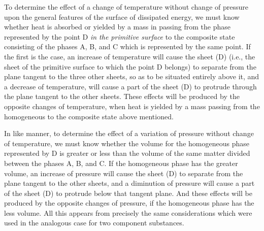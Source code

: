 \documentclass[12pt]{memoir}
\begin{document}
To determine the effect of a change of temperature without change of pressure upon the general features of the surface of dissipated energy, we must know whether heat is absorbed or yielded by a mass in passing from the phase represented by the point D \textit{in the primitive surface} to the composite state consisting of the phases A, B, and C which is represented by the same point. If the first is the case, an increase of temperature will cause the sheet (D) (i.e., the sheet of the primitive surface to which the point D belongs) to separate from the plane tangent to the three other sheets, so as to be situated entirely above it, and a decrease of temperature, will cause a part of the sheet (D) to protrude through the plane tangent to the other sheets.  These effects will be produced by the opposite changes of temperature, when heat is yielded by a mass passing from the homogeneous to the composite state above mentioned.


In like manner, to determine the effect of a variation of pressure without change of temperature, we must know whether the volume for the homogeneous phase represented by D is greater or less than the volume of the same matter divided between the phases A, B, and C. If the homogeneous phase has the greater volume, an increase of pressure will cause the sheet (D) to separate from the plane tangent to the other sheets, and a diminution of pressure will cause a part of the sheet (D) to protrude below that tangent plane. And these effects will be produced by the opposite changes of pressure, if the homogeneous phase has the less volume. All this appears from precisely the same considerations which were used in the analogous case for two component substances.

\end{document}
